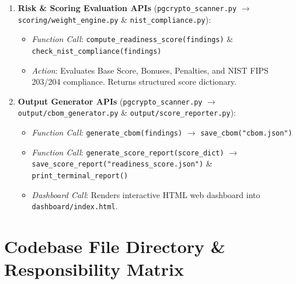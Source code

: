 \documentclass[11pt,a4paper,landscape]{article}
\begin{document}
\begin{enumerate}
\begin{itemize}
        \item \textit{Action}: Combines findings and groups occurrences per unique algorithm family to prevent duplicate counting.
    \end{itemize}
    \item \textbf{Risk \& Scoring Evaluation APIs} (\texttt{pgcrypto\_scanner.py} $\rightarrow$ \texttt{scoring/weight_engine.py} \& \texttt{nist_compliance.py}):
    \begin{itemize}
        \item \textit{Function Call}: \texttt{compute\_readiness_score(findings)} \& \texttt{check\_nist\_compliance(findings)}
        \item \textit{Action}: Evaluates Base Score, Bonuses, Penalties, and NIST FIPS 203/204 compliance. Returns structured score dictionary.
    \end{itemize}
    \item \textbf{Output Generator APIs} (\texttt{pgcrypto\_scanner.py} $\rightarrow$ \texttt{output/cbom_generator.py} \& \texttt{output/score_reporter.py}):
    \begin{itemize}
        \item \textit{Function Call}: \texttt{generate\_cbom(findings)} $\rightarrow$ \texttt{save\_cbom("cbom.json")}
        \item \textit{Function Call}: \texttt{generate\_score\_report(score_dict)} $\rightarrow$ \texttt{save\_score\_report("readiness\_score.json")} \& \texttt{print\_terminal\_report()}
        \item \textit{Dashboard Call}: Renders interactive HTML web dashboard into \texttt{dashboard/index.html}.
    \end{itemize}
\end{enumerate}

\newpage

\section{Codebase File Directory \& Responsibility Matrix}
\end{document}

